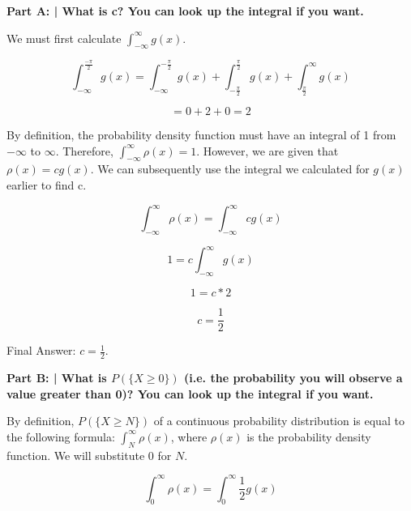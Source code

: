 \documentclass{article}
\begin{document}
 \textbf{Part A: | What is c? You can look up the integral if you want.}\newline
 
 We must first calculate $\int_{-\infty}^{\infty}g(x)$.
 
 \begin{displaymath}
   \int_{-\infty}^{\frac{-\pi}{2}}g(x) = 
   \int_{-\infty}^{-\frac{\pi}{2}}g(x) + \int_{-\frac{\pi}{2}}^{\frac{\pi}{2}}g(x) + \int_{\frac{\pi}{2}}^{\infty}g(x)
 \end{displaymath}
 
 \begin{displaymath}
   = 0 + 2 + 0 = 2
 \end{displaymath}
  
 By definition, the probability density function must have an integral of 1 from $-\infty$ to $\infty$. Therefore, $\int_{-\infty}^{\infty}\rho(x) = 1$. However, we are given that $\rho(x) = cg(x)$. We can subsequently use the integral we calculated for $g(x)$ earlier to find c. \newline
  
 \begin{displaymath}
    \int_{-\infty}^{\infty}\rho(x)=\int_{-\infty}^{\infty}cg(x)
 \end{displaymath}
 
 \begin{displaymath}
    1=c\int_{-\infty}^{\infty}g(x)
 \end{displaymath}
 
 \begin{displaymath}
    1=c*2
 \end{displaymath}
 
 \begin{displaymath}
    c=\frac{1}{2}
 \end{displaymath}
 
 Final Answer: $c=\frac{1}{2}$.\newline
 
 \textbf{Part B: | What is $P(\{X \geq 0\})$ (i.e. the probability you will observe a value greater than 0)? You can look up the integral if you want.}\newline
 
 By definition, $P(\{X \geq N\})$ of a continuous probability distribution is equal to the following formula: $\int_{N}^{\infty}\rho(x)$, where $\rho(x)$ is the probability density function. We will substitute $0$ for $N$.
 
 \begin{displaymath}
    \int_{0}^{\infty}\rho(x) = \int_{0}^{\infty}\frac{1}{2}g(x)
 \end{displaymath}
 
\end{document}

